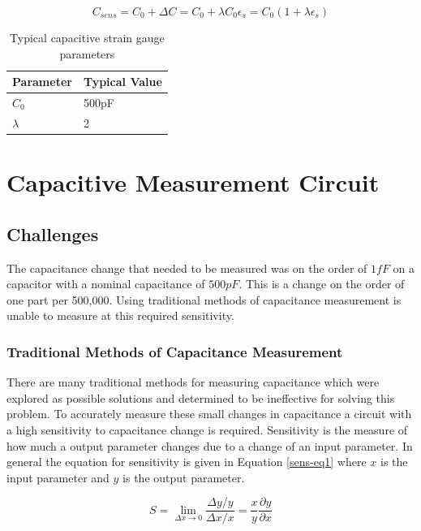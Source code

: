 \begin{equation}
	C_{sens}=C_0+\Delta C=C_0+\lambda C_0\epsilon_s=C_0(1+\lambda\epsilon_s)\label{cap-prop-eq3}
\end{equation}

\begin{table}\centering
	\begin{tabular}{|l|l|}
		\hline
		Parameter & Typical Value\\
		\hline
		$C_0$ & 500pF\\
		$\lambda$ & 2\\
		\hline
	\end{tabular}
	\caption{Typical capacitive strain gauge parameters}\label{cap-strain-table}
\end{table}

\section{Capacitive Measurement Circuit}
\subsection{Challenges}
The capacitance change that needed to be measured was on the order of $1fF$ on a capacitor with a nominal capacitance of $500pF$.  This is a change on the order of one part per 500,000.  Using traditional methods of capacitance measurement is unable to measure at this required sensitivity.  

\subsubsection{Traditional Methods of Capacitance Measurement}
There are many traditional methods for measuring capacitance which were explored as possible solutions and determined to be ineffective for solving this problem.  To accurately measure these small changes in capacitance a circuit with a high sensitivity to capacitance change is required.  Sensitivity is the measure of how much a output parameter changes due to a change of an input parameter.  In general the equation for sensitivity is given in Equation \ref{sens-eq1} where $x$ is the input parameter and $y$ is the output parameter.

\begin{equation}
	S=\lim_{\Delta x\rightarrow0}\frac{\Delta y/y}{\Delta x/x}=\frac{x}{y}\frac{\partial y}{\partial x}\label{sens-eq1}
\end{equation}

